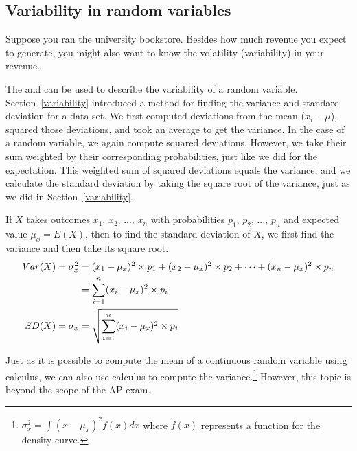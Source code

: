 

\subsection{Variability in random variables}

Suppose you ran the university bookstore. Besides how much revenue you expect to generate, you might also want to know the volatility (variability) in your revenue.

The  and  can be used to describe the variability of a random variable. Section~\ref{variability}
introduced a method for finding the variance and standard deviation for a data set. We first computed deviations from the mean ($x_i - \mu$), squared those deviations, and took an average to get the variance. In the case of a random variable, we again compute squared deviations. However, we take their sum weighted by their corresponding probabilities, just like we did for the expectation. This weighted sum of squared deviations equals the variance, and we calculate the standard deviation by taking the square root of the variance, just as we did in Section~\ref{variability}.

\begin{termBox}{
If $X$ takes outcomes $x_1$, $x_2$, ..., $x_n$ with probabilities $p_1$,  $p_2$, ..., $p_n$ and expected value $\mu_x=E(X)$, then to find the standard deviation of $X$, we first find the variance and then take its square root.
\begin{align}
Var(X) = \sigma^2_x &= (x_1-\mu_x)^2\times p_1 + (x_2-\mu_x)^2\times p_2 + \cdots +  (x_n-\mu_x)^2\times p_n \notag \\
	&= \sum_{i=1}^{n} (x_i - \mu_x)^2 \times p_i \notag \\
SD(X) = \sigma_x &= \sqrt{ \sum_{i=1}^{n} (x_i - \mu_x)^2 \times p_i}
\end{align}
}
\end{termBox}

Just as it is possible to compute the mean of a continuous random variable using calculus, we can also use calculus to compute the variance.\footnote{$\sigma^2_x = \int (x - \mu_x)^2f(x)dx$ where $f(x)$ represents a function for the density curve.} However, this topic is beyond the scope of the AP exam.

